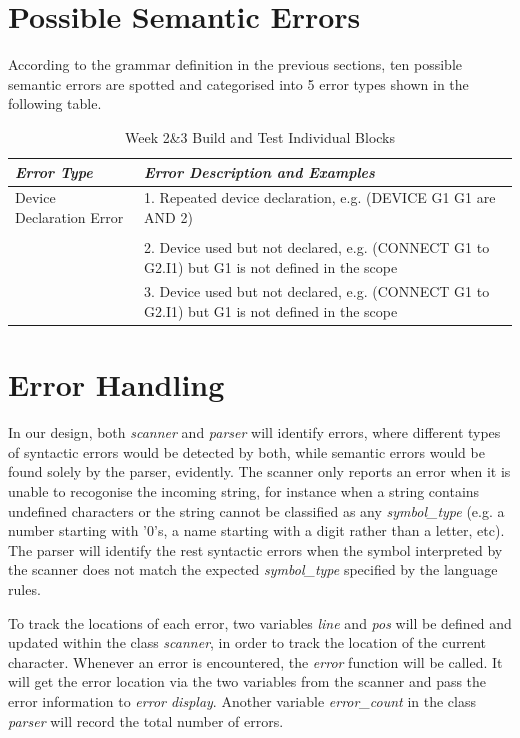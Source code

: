 \documentclass[12pt]{article}
\def\n{\noindent}
\begin{document}
\section{Possible Semantic Errors}
\n According to the grammar definition in the previous sections, ten possible semantic errors are spotted and categorised into 5 error types shown in the following table. 
\begin{table}[H]
\begin{tabular}{p{5cm}|p{10cm}}
\textit{Error Type} & \textit{Error Description and Examples}\\
\hline
Device Declaration Error & 1. Repeated device declaration, e.g. (DEVICE G1 G1 are AND 2)\\
\\
& 2. Device used but not declared, e.g. (CONNECT G1 to G2.I1) but G1 is not defined in the scope\\
& 3. Device used but not declared, e.g. (CONNECT G1 to G2.I1) but G1 is not defined in the scope\\
\end{tabular}
\caption{Week 2\&3 Build and Test Individual Blocks}
\end{table}

\section{Error Handling}
\n In our design, both \textit{scanner} and \textit{parser} will identify errors, where different types of syntactic errors would be detected by both, while semantic errors would be found solely by the parser, evidently. The scanner only reports an error when it is unable to recogonise the incoming string, for instance when a string contains undefined characters or the string cannot be classified as any \emph{symbol\_type} (e.g. a number starting with '0's, a name starting with a digit rather than a letter, etc). The parser will identify the rest syntactic errors when the symbol interpreted by the scanner does not match the expected \emph{symbol\_type} specified by the language rules.


\vspace{0.3cm}

\n To track the locations of each error, two variables \textit{line} and \textit{pos} will be defined and updated within the class \textit{scanner}, in order to track the location of the current character. Whenever an error is encountered, the \textit{error} function will be called. It will get the error location via the two variables from the scanner and pass the error information to \textit{error display}. Another variable \emph{error\_count} in the class \textit{parser} will record the total number of errors.
\end{document}
